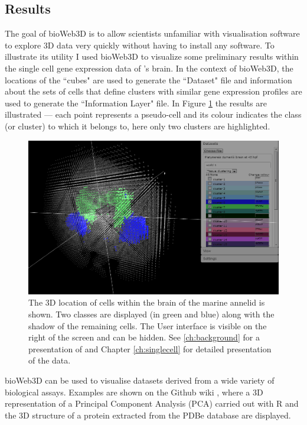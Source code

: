 	\subsection{Results}

	The goal of bioWeb3D is to allow scientists unfamiliar with visualisation software to explore 3D data very quickly without having to install any software.
	To illustrate its utility I used bioWeb3D to visualize some preliminary results within the single cell gene expression data of \platy{}'s brain. In the context of bioWeb3D, the locations of the ``cubes" are used to generate the ``Dataset" file and information about the sets of cells that define clusters with similar gene expression profiles are used to generate the ``Information Layer" file. In Figure \ref{fig:bioweb3d} the results are illustrated ---  each point represents a pseudo-cell and its colour indicates the class (or cluster) to which it belongs to, here only two clusters are highlighted. 
	
	\begin{figure}[h]
\centerline{\includegraphics[width=\linewidth]{gfx/chapter3/bioweb3d.png}}
\caption{The 3D location of cells within the brain of the marine annelid \platyfull{} is shown. Two classes are displayed (in green and blue) along with the shadow of the remaining cells. The User interface is visible on the right of the screen and can be hidden. See \ref{ch:background} for a presentation of \platy{} and Chapter \ref{ch:singlecell} for detailed presentation of the data.}\label{fig:bioweb3d}
	\end{figure}

	bioWeb3D can be used to visualise datasets derived from a wide variety of biological assays. Examples are shown on the Github wiki \cite{github}, where a 3D representation of a Principal Component Analysis (PCA) carried out with R and the 3D structure of a protein extracted from the PDBe database are displayed.\\
	
